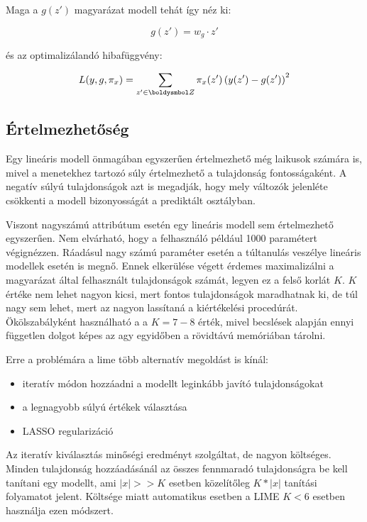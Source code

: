 Maga a $g(z')$ magyarázat modell tehát így néz ki:

\begin{equation}
    g(z') = w_g\cdot z'
\end{equation}

és az optimalizálandó hibafüggvény:

\begin{equation}
    L(y,g,\pi_x) = \sum_{z' \in \boldysmbol Z} \pi_x(z')\left(y(z')-g(z')\right)^2 
\end{equation}


\subsection{Értelmezhetőség}

Egy lineáris modell önmagában egyszerűen értelmezhető még laikusok számára is, mivel a menetekhez tartozó súly értelmezhető a tulajdonság fontosságaként. A negatív súlyú tulajdonságok azt is megadják, hogy mely változók jelenléte csökkenti a modell bizonyosságát a prediktált osztályban.

Viszont nagyszámú attribútum esetén egy lineáris modell sem értelmezhető egyszerűen. Nem elvárható, hogy a felhasználó például 1000 paramétert végignézzen. Ráadásul nagy számú paraméter esetén a túltanulás veszélye lineáris modellek esetén is megnő.
Ennek elkerülése végett érdemes maximalizálni a magyarázat által felhasznált tulajdonságok számát, legyen ez a felső korlát $K$. $K$ értéke nem lehet nagyon kicsi, mert fontos tulajdonságok maradhatnak ki, de túl nagy sem lehet, mert az nagyon lassítaná a kiértékelési procedúrát. Ökölszabályként használható a a $K=7-8$ érték, mivel becslések alapján ennyi független dolgot képes az agy egyidőben a rövidtávú memóriában tárolni. 

Erre a problémára a lime több alternatív megoldást is kínál:
\begin{itemize}
    \item iteratív módon hozzáadni a modellt leginkább javító tulajdonságokat
    \item a legnagyobb súlyú értékek választása
    \item LASSO regularizáció
\end{itemize}

Az iteratív kiválasztás minőségi eredményt szolgáltat, de nagyon költséges. Minden tulajdonság hozzáadásánál az összes fennmaradó tulajdonságra be kell tanítani egy modellt, ami $|x| >> K$ esetben közelítőleg $K*|x|$ tanítási folyamatot jelent. Költsége miatt automatikus esetben a LIME $K<6$ esetben használja ezen módszert. 


